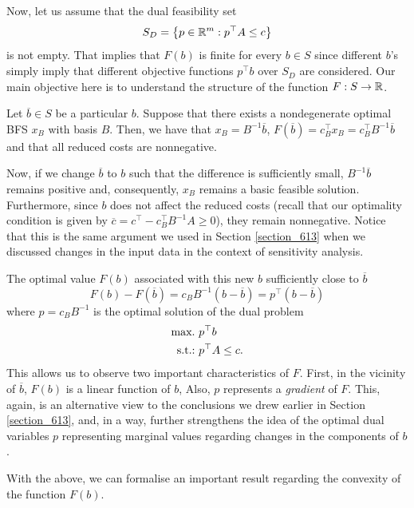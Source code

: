 Now, let us assume that the dual feasibility set 
%
\begin{equation*}
	S_D = \left\{ p \in \mathbb{R}^m : p^\top A \le c \right \}	
\end{equation*}
% 
is not empty. That implies that $F(b)$ is finite for every $b \in S$ since different $b$'s simply imply that different objective functions $p^\top b$ over $S_D$ are considered. Our main objective here is to understand the structure of the function $F: S \to \mathbb{R}$. 

Let $\overline{b} \in S$ be a particular $b$. Suppose that there exists a nondegenerate optimal BFS $x_B$ with basis $B$. Then, we have that $x_B = B^{-1}\overline{b}$, $F(\overline{b}) = c_B^\top x_B =  c_B^\top B^{-1}\overline{b}$ and that all reduced costs are nonnegative. 

Now, if we change $\overline{b}$ to $b$ such that the difference is sufficiently small, $B^{-1}\overline{b}$ remains positive and, consequently, $x_B$ remains a basic feasible solution. Furthermore, since $b$ does not affect the reduced costs (recall that our optimality condition is given by $\overline{c} = c^\top - c_B ^\top B^{-1}A \ge 0$), they remain nonnegative. Notice that this is the same argument we used in Section \ref{section_613} when we discussed changes in the input data in the context of sensitivity analysis.

The optimal value $F(b)$ associated with this new $b$ sufficiently close to $\overline{b}$   
%
\begin{equation*}
	F(b) - F(\overline{b})= c_B B^{-1}(b - \overline{b}) = p^\top (b - \overline{b}) 
\end{equation*}
%
where $p = c_B B^{-1}$ is the optimal solution of the dual problem 
%
\begin{align*}
	\mathop{\text{max.~}} & p^\top b \\
	\mathop{\text{s.t.:~}}   & p^\top A \le c.
\end{align*}
%
This allows us to observe two important characteristics of $F$. First, in the vicinity of $\overline{b}$, $F(b)$ is a linear function of $b$, Also, $p$ represents a \emph{gradient} of $F$. This, again, is an alternative view to the conclusions we drew earlier in Section \ref{section_613}, and, in a way, further strengthens the idea of the optimal dual variables $p$ representing marginal values regarding changes in the components of $b$.

With the above, we can formalise an important result regarding the convexity of the function $F(b)$.

